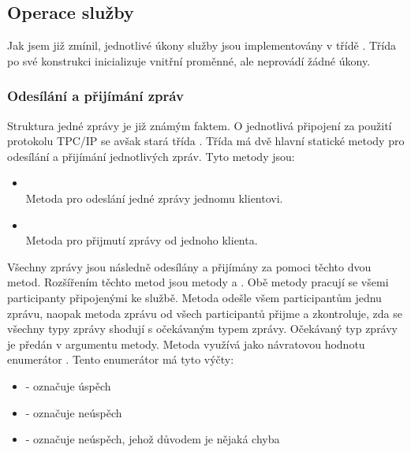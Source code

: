 \subsection{Operace služby}

Jak jsem již zmínil, jednotlivé úkony služby jsou implementovány v třídě . Třída po své konstrukci inicializuje vnitřní proměnné, ale neprovádí žádné úkony. 

\subsubsection{Odesílání a přijímání zpráv}
Struktura jedné zprávy je již známým faktem. O jednotlivá připojení za použití protokolu TPC/IP se avšak stará třída . Třída má dvě hlavní statické metody pro odesílání a přijímání jednotlivých zpráv. Tyto metody jsou:

\begin{itemize}
    \item {} \\
    Metoda pro odeslání jedné zprávy jednomu klientovi.
    \item {} \\
    Metoda pro přijmutí zprávy od jednoho klienta.
\end{itemize}

Všechny zprávy jsou následně odesílány a přijímány za pomoci těchto dvou metod. Rozšířením těchto metod jsou metody  a . Obě metody pracují se všemi participanty připojenými ke službě. Metoda  odešle všem participantům jednu zprávu, naopak metoda  zprávu od všech participantů přijme a zkontroluje, zda se všechny typy zprávy shodují s očekávaným typem zprávy. Očekávaný typ zprávy je předán v argumentu metody. Metoda  využívá jako návratovou hodnotu enumerátor . Tento enumerátor má tyto výčty:

\begin{itemize}
    \item {} - označuje úspěch
    \item {} - označuje neúspěch
    \item {} - označuje neúspěch, jehož důvodem je nějaká chyba
\end{itemize}

